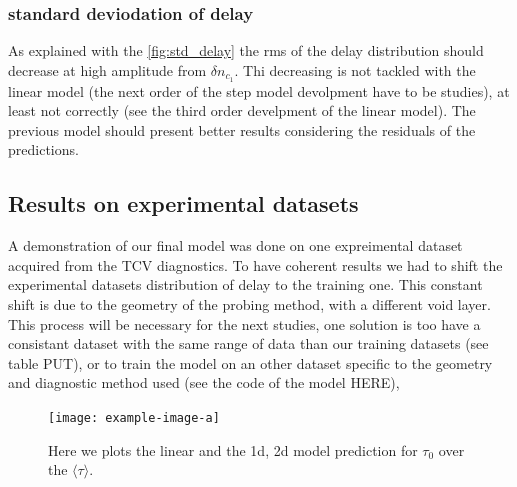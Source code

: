 \documentclass[11pt,a4paper,openany]{report}
\begin{document}
\begin{multicols}{2}
    \subsubsection{standard deviodation of delay}
    As explained with the \ref{fig:std_delay} the rms of the delay distribution should decrease at high amplitude from $\delta n_{c_1}$. Thi decreasing is not tackled with the linear model (the next order of the  step model devolpment have to be studies), at least not correctly (see the third order develpment of the linear model). The previous model should present better results considering the residuals  of the predictions.
    \subsection{Results on experimental datasets}

    A demonstration of our final model was done on one expreimental dataset acquired from the TCV diagnostics. To have coherent results we had to shift the experimental datasets distribution of delay to the training one. This constant shift is due to the geometry of the probing method, with a different void layer. This process will be necessary for the next studies, one solution is too have a consistant dataset with the same range of data than our training datasets (see table PUT), or to train the model on an other dataset specific to the geometry and diagnostic method used (see the code of the model HERE),

    \begin{figure}[H]
        \centering
        \texttt{[image: example-image-a]}
        \label{}
        \caption{Here we plots the linear and the 1d, 2d model prediction for $\tau_0$ over the $\langle \tau \rangle$.}
    \end{figure}



\end{multicols}
\end{document}
